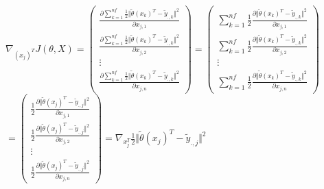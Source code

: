 \documentclass[a4paper,10pt]{article}
\begin{document}
\subsection{}  
\label{P1}  
$\nabla_{(x_{j})^T} J(\theta, X)=  
\begin{pmatrix}  
\displaystyle\frac{\partial \displaystyle\sum_{k=1}^{nf}\frac{1}{2}\Vert\tilde{\theta}(x_{k})^{T}-\tilde{y}_{.,k}\Vert^{2}}{\partial x_{j,1}}\\  
\displaystyle\frac{\partial \displaystyle\sum_{k=1}^{nf}\frac{1}{2}\Vert\tilde{\theta}(x_{k})^{T}-\tilde{y}_{.,k}\Vert^{2}}{\partial x_{j,2}}\\  
\vdots\\  
\displaystyle\frac{\partial \displaystyle\sum_{k=1}^{nf}\frac{1}{2}\Vert\tilde{\theta}(x_{k})^{T}-\tilde{y}_{.,k}\Vert^{2}}{\partial x_{j,n}}  
\end{pmatrix}  
=  
\begin{pmatrix}  
\displaystyle\sum_{k=1}^{nf}  
\frac{1}{2}\frac{\partial\Vert\tilde{\theta}(x_{k})^{T}-\tilde{y}_{.,k}\Vert^{2}}{\partial x_{j,1}}\\  
\displaystyle\sum_{k=1}^{nf}  
\frac{1}{2}\frac{\partial\Vert\tilde{\theta}(x_{k})^{T}-\tilde{y}_{.,k}\Vert^{2}}{\partial x_{j,2}}\\  
\vdots\\  
\displaystyle\sum_{k=1}^{nf}  
\frac{1}{2}\frac{\partial\Vert\tilde{\theta}(x_{k})^{T}-\tilde{y}_{.,k}\Vert^{2}}{\partial x_{j,n}}  
\end{pmatrix}$\\  
$  
=  
\begin{pmatrix}  
\displaystyle  
\frac{1}{2}\frac{\partial\Vert\tilde{\theta}(x_{j})^{T}-\tilde{y}_{.,j}\Vert^{2}}{\partial x_{j,1}}\\  
\displaystyle  
\frac{1}{2}\frac{\partial\Vert\tilde{\theta}(x_{j})^{T}-\tilde{y}_{.,j}\Vert^{2}}{\partial x_{j,2}}\\  
\vdots\\  
\displaystyle  
\frac{1}{2}\frac{\partial\Vert\tilde{\theta}(x_{j})^{T}-\tilde{y}_{.,j}\Vert^{2}}{\partial x_{j,n}}  
\end{pmatrix}  
=  
\displaystyle  
\nabla_{x_{j}^T}\frac{1}{2}\Vert\tilde{\theta}(x_{j})^{T}-\tilde{y}_{.,j}\Vert^{2}  
$  
\end{document}
